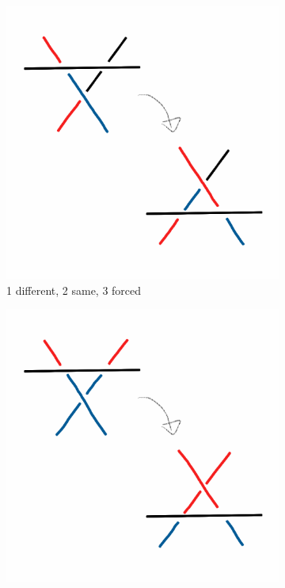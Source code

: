 \documentclass[12pt,letterpaper]{article}
\theoremstyle{definition}
\begin{document}
\begin{figure}[h!]
    \centering
    \begin{subfigure}{.3\textwidth}
        \centering
        \includegraphics[width=\textwidth]{meeting10pics/1d2s.png}
        \caption{1 different, 2 same, 3 forced}
    \end{subfigure}
    \quad
    \begin{subfigure}{.3\textwidth}
        \centering
        \includegraphics[width=\textwidth]{meeting10pics/1d2d3s.png}

\end{subfigure}
\end{figure}
\end{document}
